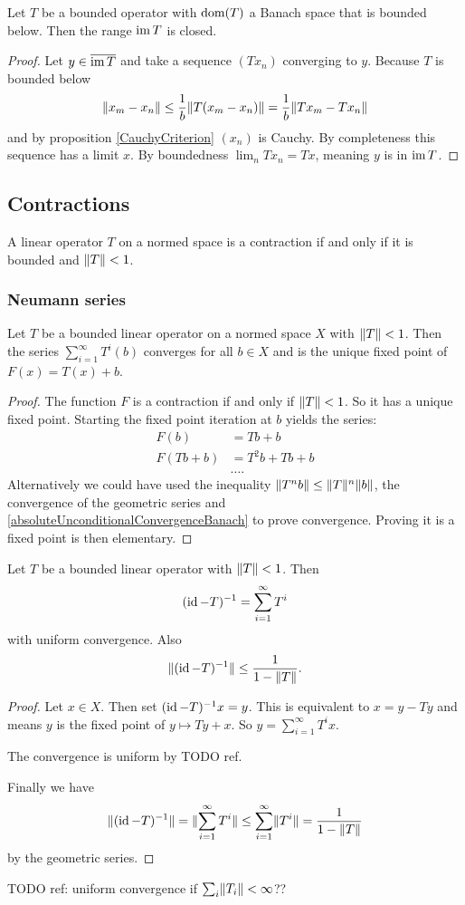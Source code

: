 \begin{proposition} \label{boundedBelowClosedRange}
Let $T$ be a bounded operator with $\operatorname{dom}(T)$ a Banach space that is bounded below. Then the range $\operatorname{im} T$ is closed.
\end{proposition}
\begin{proof}
Let $y\in \overline{\operatorname{im} T}$ and take a sequence $(Tx_n)$ converging to $y$. Because $T$ is bounded below
\[ \lVert x_m-x_n\rVert \leq \frac{1}{b}\lVert T(x_m-x_n)\rVert = \frac{1}{b}\lVert Tx_m-Tx_n\rVert \]
and by proposition \ref{CauchyCriterion} $(x_n)$ is Cauchy. By completeness this sequence has a limit $x$. By boundedness $\lim_n Tx_n = Tx$, meaning $y$ is in $\operatorname{im} T$.
\end{proof}

\subsection{Contractions}
A linear operator $T$ on a normed space is a contraction if and only if it is bounded and $\lVert T\rVert<1$. 

\subsubsection{Neumann series}
\begin{lemma}
Let $T$ be a bounded linear operator on a normed space $X$ with $\lVert T\rVert<1$. Then the series $\sum^\infty_{i=1}T^i(b)$ converges for all $b\in X$ and is the unique fixed point of $F(x) = T(x)+b$.
\end{lemma}
\begin{proof}
The function $F$ is a contraction if and only if $\lVert T\rVert<1$. So it has a unique fixed point. Starting the fixed point iteration at $b$ yields the series:
\begin{align*}
F(b) &= Tb + b \\
F(Tb+b) &= T^2b + Tb + b \\
&\hdots.
\end{align*}
Alternatively we could have used the inequality $\lVert T^nb\rVert \leq \lVert T\rVert^n\lVert b\rVert$, the convergence of the geometric series and \ref{absoluteUnconditionalConvergenceBanach} to prove convergence. Proving it is a fixed point is then elementary.
\end{proof}
\begin{corollary} \label{operatorNeumannSeries}
Let $T$ be a bounded linear operator with $\lVert T\rVert<1$. Then
\[ (\operatorname{id} - T)^{-1} = \sum_{i=1}^\infty T^i \]
with uniform convergence. Also
\[ \lVert(\operatorname{id} - T)^{-1}\rVert \leq \frac{1}{1-\lVert T\rVert}. \]
\end{corollary}
\begin{proof}
Let $x\in X$. Then set $(\operatorname{id} - T)^{-1}x = y$. This is equivalent to $x = y-Ty$ and means $y$ is the fixed point of $y\mapsto Ty+x$. So $y = \sum_{i=1}^\infty T^ix$.

The convergence is uniform by TODO ref.

Finally we have
\[ \lVert(\operatorname{id} - T)^{-1}\rVert = \lVert\sum_{i=1}^\infty T^i\rVert \leq \sum_{i=1}^\infty \lVert T^i\rVert = \frac{1}{1-\lVert T\rVert} \]
by the geometric series.
\end{proof}
TODO ref: uniform convergence if $\sum_i \lVert T_i\rVert < \infty$??


